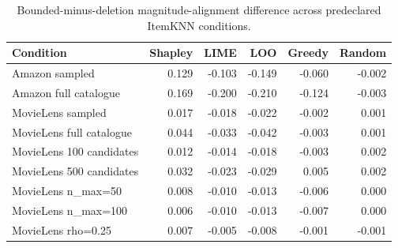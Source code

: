 \begin{table}[t]\centering\scriptsize
\caption{Bounded-minus-deletion magnitude-alignment difference across predeclared ItemKNN conditions.}
\label{tab:appC4}
\begin{tabular}{lrrrrr}
\toprule
Condition & Shapley & LIME & LOO & Greedy & Random \\
\midrule
Amazon sampled & 0.129 & -0.103 & -0.149 & -0.060 & -0.002 \\
Amazon full catalogue & 0.169 & -0.200 & -0.210 & -0.124 & -0.003 \\
MovieLens sampled & 0.017 & -0.018 & -0.022 & -0.002 & 0.001 \\
MovieLens full catalogue & 0.044 & -0.033 & -0.042 & -0.003 & 0.001 \\
MovieLens 100 candidates & 0.012 & -0.014 & -0.018 & -0.003 & 0.002 \\
MovieLens 500 candidates & 0.032 & -0.023 & -0.029 & 0.005 & 0.002 \\
MovieLens n_max=50 & 0.008 & -0.010 & -0.013 & -0.006 & 0.000 \\
MovieLens n_max=100 & 0.006 & -0.010 & -0.013 & -0.007 & 0.000 \\
MovieLens rho=0.25 & 0.007 & -0.005 & -0.008 & -0.001 & -0.001 \\
\bottomrule
\end{tabular}
\end{table}
